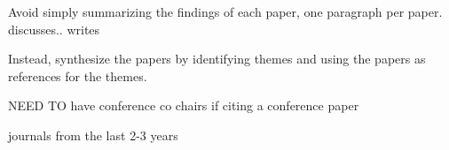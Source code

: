Avoid simply summarizing the findings of each paper, one paragraph per paper. \cite{hosseini2016adaptive} discusses.. \cite{SURV} writes  

Instead, synthesize the papers by identifying themes and using the papers as references for the themes. 

NEED TO have conference co chairs if citing a conference paper

journals from the last 2-3 years

